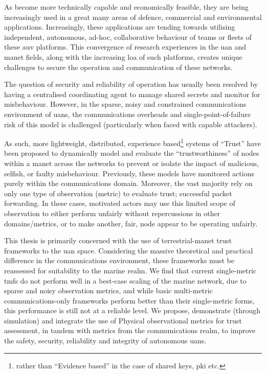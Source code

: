 As  become more technically capable and economically feasible, they are being increasingly used in a great many areas of defence, commercial and environmental applications. 
Increasingly, these applications are tending towards utilising independent, autonomous, ad-hoc, collaborative behaviour of teams or fleets of these \gls{auv} platforms.
This convergence of research experiences in the \acrfull{uan} and \gls{manet} fields, along with the increasing \gls{loa} of such platforms, creates unique challenges to secure the operation and communication of these networks.

The question of security and reliability of operation has usually been resolved by having a centralised coordinating agent to manage shared secrets and monitor for misbehaviour.
However, in the sparse, noisy and constrained communications environment of \glspl{uan}, the communications overheads and single-point-of-failure risk of this model is challenged (particularly when faced with capable attackers).

As such, more lightweight, distributed, experience based\footnote{rather than ``Evidence based'' in the case of shared keys, \gls{pki} etc.} systems of ``Trust'' have been proposed to dynamically model and evaluate the ``trustworthiness'' of nodes within a \gls{manet} across the networks to prevent or isolate the impact of malicious, selfish, or faulty misbehaviour. 
Previously, these models have monitored actions purely within the communications domain. 
Moreover, the vast majority rely on only one type of observation (metric) to evaluate trust; successful packet forwarding.
In these cases, motivated actors may use this limited scope of observation to either perform unfairly without repercussions in other domains/metrics, or to make another, fair, node appear to be operating unfairly.

This thesis is primarily concerned with the use of terrestrial-\gls{manet} trust frameworks to the \gls{uan} space. 
Considering the massive theoretical and practical difference in the communications environment, these frameworks must be reassessed for suitability to the marine realm. 
We find that current single-metric \glspl{tmf} do not perform well in a best-case scaling of the marine network, due to sparse and noisy observation metrics, and while basic multi-metric communications-only frameworks perform better than their single-metric forms, this performance is still not at a reliable level. 
We propose, demonstrate (through simulation) and integrate the use of Physical observational metrics for trust assessment, in tandem with metrics from the communications realm, to improve the safety, security, reliability and integrity of autonomous \glspl{uan}.

